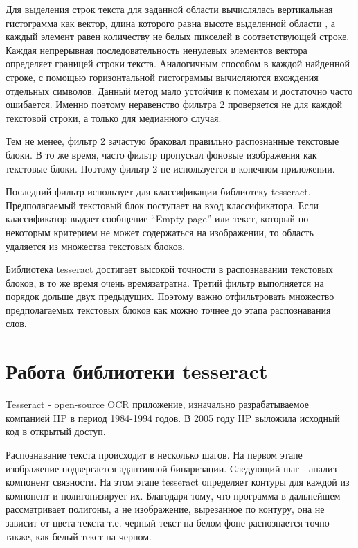 \documentclass[oneside,final,14pt]{extreport}
\begin{document}
 Для выделения строк текста для заданной области вычислялась вертикальная гистограмма как вектор, длина которого равна высоте выделенной области , а каждый элемент равен количеству не белых пикселей в соответствующей строке. Каждая непрерывная последовательность ненулевых элементов вектора определяет границей строки текста. Аналогичным способом в каждой найденной строке, с помощью горизонтальной гистограммы вычисляются вхождения отдельных символов. Данный метод мало устойчив к помехам и достаточно часто ошибается. Именно поэтому неравенство фильтра 2 проверяется не для каждой текстовой строки, а только для медианного случая. 

Тем не менее, фильтр 2 зачастую браковал правильно распознанные текстовые блоки. В то же время, часто фильтр пропускал фоновые изображения как текстовые блоки. Поэтому фильтр 2 не используется в конечном приложении.

Последний фильтр использует для классификации библиотеку tesseract. Предполагаемый текстовый блок поступает на вход классификатора.  Если классификатор выдает сообщение “Empty page” или текст, который по некоторым критерием не может содержаться на изображении, то область удаляется из множества текстовых блоков. 

Библиотека tesseract достигает высокой точности в распознавании текстовых блоков, в то же время очень времязатратна. Третий фильтр выполняется на порядок дольше двух предыдущих. Поэтому важно отфильтровать множество предполагаемых текстовых блоков как можно точнее до этапа распознавания слов.

\section{Работа библиотеки tesseract}

Tesseract - open-source OCR приложение, изначально разрабатываемое компанией HP в период 1984-1994 годов. В 2005 году HP выложила исходный код  в открытый доступ\cite{Smith:Tesseract}. 

Распознавание текста происходит в несколько шагов. На первом этапе изображение подвергается адаптивной бинаризации. Следующий шаг - анализ компонент связности. На этом этапе tesseract определяет контуры для каждой из компонент и полигонизирует их. Благодаря тому, что программа в дальнейшем рассматривает полигоны, а не изображение, вырезанное по контуру, она не зависит от цвета текста т.е. черный текст на белом фоне распознается точно также, как белый текст на черном. 
\end{document}
